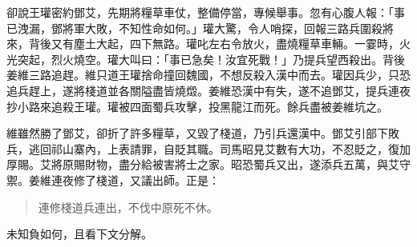 卻說王瓘密約鄧艾，先期將糧草車仗，整備停當，專候舉事。忽有心腹人報：「事已洩漏，鄧將軍大敗，不知性命如何。」瓘大驚，令人哨探，回報三路兵圍殺將來，背後又有塵土大起，四下無路。瓘叱左右令放火，盡燒糧草車輛。一霎時，火光突起，烈火燒空。瓘大叫曰：「事已急矣！汝宜死戰！」乃提兵望西殺出。背後姜維三路追趕。維只道王瓘捨命撞回魏國，不想反殺入漢中而去。瓘因兵少，只恐追兵趕上，遂將棧道並各關隘盡皆燒燬。姜維恐漢中有失，遂不追鄧艾，提兵連夜抄小路來追殺王瓘。瓘被四面蜀兵攻擊，投黑龍江而死。餘兵盡被姜維坑之。

維雖然勝了鄧艾，卻折了許多糧草，又毀了棧道，乃引兵還漢中。鄧艾引部下敗兵，逃回祁山寨內，上表請罪，自貶其職。司馬昭見艾數有大功，不忍貶之，復加厚賜。艾將原賜財物，盡分給被害將士之家。昭恐蜀兵又出，遂添兵五萬，與艾守禦。姜維連夜修了棧道，又議出師。正是：

\begin{quote}
連修棧道兵連出，不伐中原死不休。
\end{quote}

未知負如何，且看下文分解。
